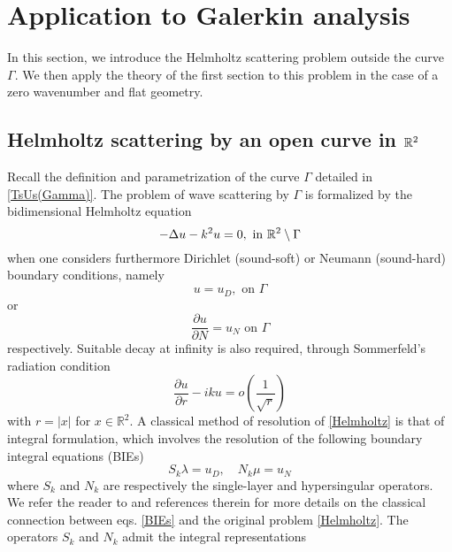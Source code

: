 \documentclass[a4paper]{article}
\begin{document}
\section{Application to Galerkin analysis}

In this section, we introduce the Helmholtz scattering problem outside the curve $\Gamma$. We then apply the theory of the first section to this problem in the case of a zero wavenumber and flat geometry. 

\subsection{Helmholtz scattering by an open curve in $\mathbb{R}^2$}

Recall the definition and parametrization of the curve $\Gamma$ detailed in \autoref{TsUs(Gamma)}. The problem of wave scattering by $\Gamma$ is formalized by the bidimensional Helmholtz equation
\begin{equation}
-\Delta u - k^2 u = 0,  \text{ in } \mathbb{R}^2 \setminus \Gamma
\label{Helmholtz}
\end{equation}
when one considers furthermore Dirichlet (sound-soft) or Neumann (sound-hard) boundary conditions, namely
\begin{equation}
u = u_D, \text{ on } \Gamma
\label{Dirichlet}
\end{equation}
or
\begin{equation} 
\dfrac{\partial u}{\partial N} = u_N  \text{ on } \Gamma 
\label{Neumann}
\end{equation}
respectively. Suitable decay at infinity is also required, through Sommerfeld's radiation condition
\begin{equation}
\dfrac{\partial u}{\partial r} - iku = o\left(\frac{1}{\sqrt{r}}\right)
\label{Sommerfeld}
\end{equation}
with $r=|x|$ for $x\in \mathbb{R}^2$. A classical method of resolution of \eqref{Helmholtz} is that of integral formulation, which involves the resolution of the following boundary integral equations (BIEs)
\begin{equation}
	\label{BIEs}
	S_{k} \lambda = u_D, \quad N_k \mu = u_N
\end{equation}
where $S_k$ and $N_k$ are respectively the single-layer and hypersingular operators. We refer the reader to \cite{alouges2018new} and references therein for more details on the classical connection between eqs. \eqref{BIEs} and the original problem \eqref{Helmholtz}. The operators $S_k$ and $N_k$ admit the integral representations
\end{document}
